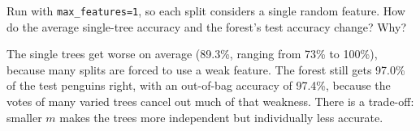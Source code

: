 \begin{Exercise}[label=bag6, title={One feature at a time}]
Run  with \verb|max_features=1|, so each split considers a single random feature. How do the
average single-tree accuracy and the forest's test accuracy change? Why?
\end{Exercise}
\begin{Answer}[ref=bag6]
The single trees get worse on average (89.3\%, ranging from 73\% to 100\%), because many splits are forced
to use a weak feature. The forest still gets 97.0\% of the test penguins right, with an out-of-bag accuracy of
97.4\%, because the votes of many varied trees cancel out much of that weakness. There is a trade-off: smaller $m$ makes the trees more independent but individually less
accurate.
\end{Answer}

